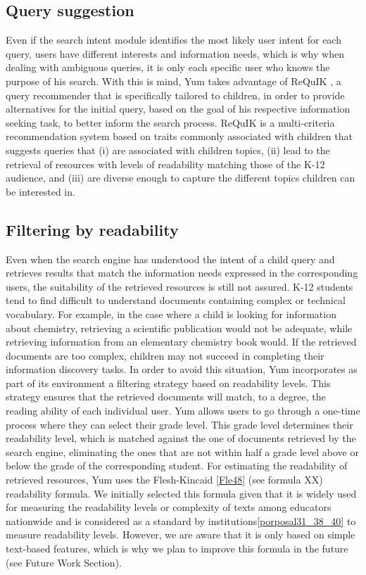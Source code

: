 \documentclass{sig-alternate-05-2015}
\begin{document}
\subsection{Query suggestion}
Even if the search intent module identifies the most likely user intent for each query, users have different interests and information needs, which is why when dealing with ambiguous queries, it is only each specific user who knows the purpose of his search. With this is mind,  Yum takes advantage of ReQuIK \cite{requik}, a query recommender that is specifically tailored to children, in order to provide alternatives for the initial query, based on the goal of his respective information seeking task, to better inform the search process. ReQuIK is a multi-criteria recommendation system based on traits commonly associated with children that suggests queries that (i) are associated with children topics, (ii) lead to the retrieval of resources with levels of readability matching those of the K-12 audience, and (iii) are diverse enough to capture the different topics children can be interested in.


\subsection{Filtering by readability}
Even when the search engine has understood the intent of a child query and retrieves results that match the information needs expressed in the corresponding users, the suitability of the retrieved resources is still not assured.  K-12 students tend to find difficult to understand documents containing complex or technical vocabulary. For example, in the case where a child is looking for information about chemistry, retrieving a scientific publication would not be adequate, while retrieving information from an elementary chemistry book would. If the retrieved documents are too complex, children may not succeed in completing their information discovery tasks. In order to avoid this situation, Yum incorporates as part of its environment a filtering strategy based on readability levels. This strategy   ensures that the retrieved documents will match, to a degree, the reading ability of each individual user. Yum allows users to go through a one-time process where they can select their grade level. This grade level determines their readability level, which is matched against the one of documents retrieved by the search engine, eliminating the ones that are not within half a grade level above or below the grade of the corresponding student. For estimating the readability of retrieved resources, Yum uses the Flesh-Kincaid \ref{Fle48} (see formula XX) readability formula. We initially selected this formula given that it is widely used for measuring the readability levels or complexity of texts among educators nationwide and is considered as a standard by institutions\ref{porposal31_38_40} to measure readability levels.  However, we are aware that it is only based on simple text-based features, which is why we plan to improve this formula in the future (see Future Work Section).
\end{document}
